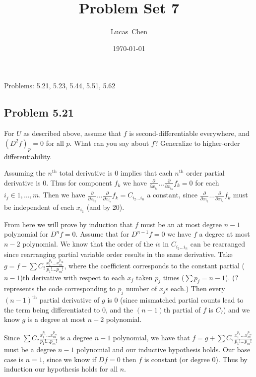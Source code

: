 \documentclass{amsart}
\title{Problem Set 7}
\author{Lucas\ Chen}
\date{\today}
\begin{document}
\maketitle

Problems: 5.21, 5.23, 5.44, 5.51, 5.62

\subsection*{Problem 5.21} For \( U \) as described above, assume that \( f \) is second-differentiable everywhere, and \( (D^2 f)_p = 0 \) for all \( p \). What can you say about \( f \)? Generalize to higher-order differentiability.

\medskip \noindent Assuming the $n^{\text{th}}$ total derivative is $0$ implies that each $n^{\text{th}}$ order
partial derivative is $0$. Thus for component $f_k$ we have $\frac{\partial}{\partial x_{i_1}}\dots\frac{\partial}{\partial x_{i_n}}f_k =0$
for each $i_j\in 1,\dots,m$. Then we have $\frac{\partial}{\partial x_{i_2}}\dots\frac{\partial}{\partial x_{i_n}}f_k= C_{i_2\dots i_n}$ a constant,
since $\frac{\partial}{\partial x_{i_2}}\dots\frac{\partial}{\partial x_{i_n}}f_k$ must be independent of each $x_{i_1}$ (and by 20).

\medskip \noindent From here we will prove by induction that $f$ must be an at most degree $n-1$ polynomial for 
$D^nf=0$. Assume that for $D^{n-1}f=0$ we have $f$ a degree at most $n-2$ polynomial. We know that the order of the $i$s in $C_{i_2\dots i_n}$ 
can be rearranged since rearranging partial variable order results in the same derivative. Take $g=f-\sum C_{?}\frac{x_1^{p_1}\dots x_m^{p_m}}{p_1!\dots p_m!}$,
where the coefficient corresponds to the constant partial ($n-1$)th derivative with respect to each $x_j$ taken $p_j$ times ($\sum p_j = n-1$). (? represents the code corresponding to $p_j$ number of $x_j$s each.)
Then every $(n-1)^{\text{th}}$ partial derivative of $g$ is 0 (since mismatched partial counts lead to the term being differentiated to $0$, and the $(n-1)$th partial of $f$ is $C_?$)
and we know $g$ is a degree at most $n-2$ polynomial. 

\medskip \noindent Since $\sum C_{?}\frac{x_1^{p_1}\dots x_m^{p_m}}{p_1!\dots p_m!}$ is a degree $n-1$ polynomial, we have
that $f= g+\sum C_{?}\frac{x_1^{p_1}\dots x_m^{p_m}}{p_1!\dots p_m!}$ must be a degree $n-1$ polynomial and our inductive hypothesis holds.
Our base case is $n=1$, since we know if $Df=0$ then $f$ is constant (or degree 0). Thus by induction our hypothesis holds for all $n$.
\end{document}
